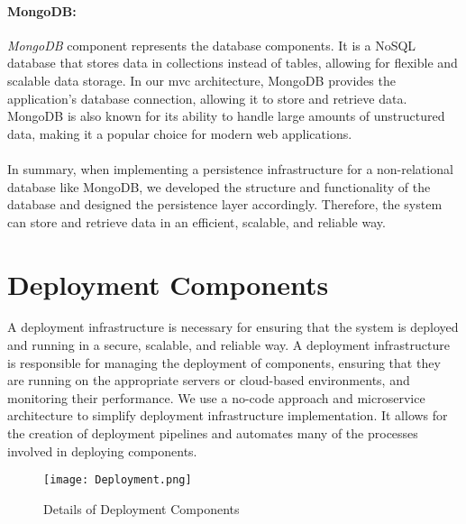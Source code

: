\clearpage
\paragraph{MongoDB:}
\textit{MongoDB} component represents the database components.
It is a NoSQL database that stores data in collections instead of tables, allowing for flexible and scalable data storage. 
In our \ac{mvc} architecture, MongoDB provides the application's database connection, allowing it to store and retrieve data. 
MongoDB is also known for its ability to handle large amounts of unstructured data, making it a popular choice for modern web applications.\\\\
In summary, when implementing a persistence infrastructure for a non-relational database like MongoDB, we developed the structure and functionality of the database and designed the persistence layer accordingly. 
Therefore, the system can store and retrieve data in an efficient, scalable, and reliable way.


\clearpage
\section{Deployment Components}
\label{sc:section:deployment}
A deployment infrastructure is necessary for ensuring that the system is deployed and running in a secure, scalable, and reliable way. 
A deployment infrastructure is responsible for managing the deployment of components, ensuring that they are running on the appropriate servers or cloud-based environments, and monitoring their performance.
We use a no-code approach and microservice architecture to simplify deployment infrastructure implementation. 
It allows for the creation of deployment pipelines and automates many of the processes involved in deploying components.

\begin{figure}[htbp!]
    \centering    
    \texttt{[image: Deployment.png]} 
    \caption[Details of Deployment Components]{Details of Deployment Components}
    \label{fig:sc:deployment}
\end{figure}

